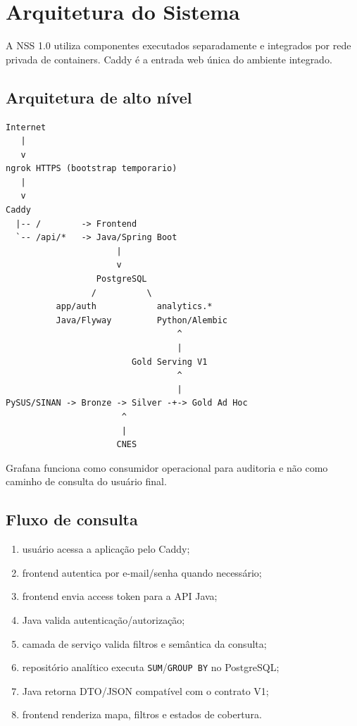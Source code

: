 \section{Arquitetura do Sistema}

A NSS 1.0 utiliza componentes executados separadamente e integrados por rede privada de containers. Caddy é a entrada web única do ambiente integrado.

\subsection{Arquitetura de alto nível}

\begin{lstlisting}
Internet
   |
   v
ngrok HTTPS (bootstrap temporario)
   |
   v
Caddy
  |-- /        -> Frontend
  `-- /api/*   -> Java/Spring Boot
                      |
                      v
                  PostgreSQL
                 /          \
          app/auth            analytics.*
          Java/Flyway         Python/Alembic
                                  ^
                                  |
                         Gold Serving V1
                                  ^
                                  |
PySUS/SINAN -> Bronze -> Silver -+-> Gold Ad Hoc
                       ^
                       |
                      CNES
\end{lstlisting}

Grafana funciona como consumidor operacional para auditoria e não como caminho de consulta do usuário final.

\subsection{Fluxo de consulta}

\begin{enumerate}
    \item usuário acessa a aplicação pelo Caddy;
    \item frontend autentica por e-mail/senha quando necessário;
    \item frontend envia access token para a API Java;
    \item Java valida autenticação/autorização;
    \item camada de serviço valida filtros e semântica da consulta;
    \item repositório analítico executa \texttt{SUM}/\texttt{GROUP BY} no PostgreSQL;
    \item Java retorna DTO/JSON compatível com o contrato V1;
    \item frontend renderiza mapa, filtros e estados de cobertura.
\end{enumerate}

